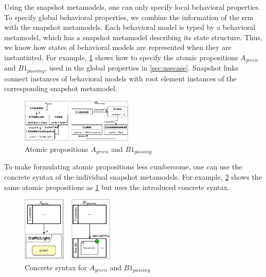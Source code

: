 \documentclass{jot}
\begin{document}

Using the snapshot metamodels, one can only specify local behavioral properties.
To specify global behavioral properties, we combine the information of the \gls*{srm} with the snapshot metamodels.
Each behavioral model is typed by a behavioral metamodel, which has a snapshot metamodel describing its state structure.
Thus, we know how states of behavioral models are represented when they are instantiated.
For example, \cref{fig:atomic_propositions} shows how to specify the atomic propositions $A_{green}$ and $B1_{passing}$, used in the global properties in \autoref{sec:usecase}.
Snapshot links connect instances of behavioral models with root element instances of the corresponding snapshot metamodel. 

\begin{figure}[h]
    \centering
    \includegraphics[width=0.475\textwidth]{figures/atomic_props.pdf}
    \caption{Atomic propositions $A_{green}$ and $B1_{passing}$}
    \label{fig:atomic_propositions}
\end{figure}

To make formulating atomic propositions less cumbersome, one can use the concrete syntax of the individual snapshot metamodels.
For example, \cref{fig:atomic_propositions_concrete} shows the same atomic propositions as \cref{fig:atomic_propositions} but uses the introduced concrete syntax.

\begin{figure}[h]
    \centering
    \includegraphics[width=0.4\textwidth]{figures/atomic_props_concrete.pdf}
    \caption{Concrete syntax for $A_{green}$ and $B1_{passing}$}
    \label{fig:atomic_propositions_concrete}
\end{figure}
\end{document}
